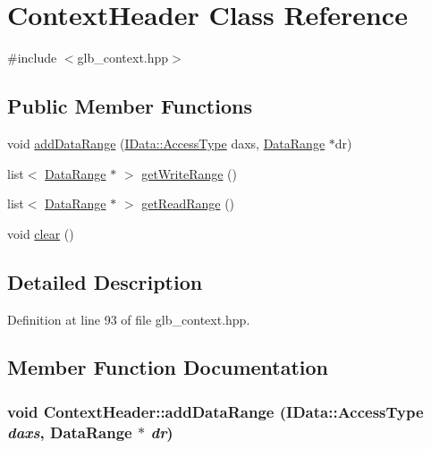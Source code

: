 \hypertarget{class_context_header}{
\section{ContextHeader Class Reference}
\label{class_context_header}
}


{\ttfamily \#include $<$glb\_\-context.hpp$>$}\subsection*{Public Member Functions}
\begin{DoxyCompactItemize}
\item 
void \hyperlink{class_context_header_af5cb224ae44fa1719f62e24b92725b95}{addDataRange} (\hyperlink{class_i_data_a771c62d4a9d89ea755b61734fb41e372}{IData::AccessType} daxs, \hyperlink{struct_data_range}{DataRange} $\ast$dr)
\item 
list$<$ \hyperlink{struct_data_range}{DataRange} $\ast$ $>$ \hyperlink{class_context_header_a7fcb0018a060e3be48a54570a9ec5723}{getWriteRange} ()
\item 
list$<$ \hyperlink{struct_data_range}{DataRange} $\ast$ $>$ \hyperlink{class_context_header_aa9ee1e1368f2fb3df487d9c63f9a5103}{getReadRange} ()
\item 
void \hyperlink{class_context_header_a06591e7f14d53be75366e52e991792f7}{clear} ()
\end{DoxyCompactItemize}


\subsection{Detailed Description}


Definition at line 93 of file glb\_\-context.hpp.

\subsection{Member Function Documentation}
\hypertarget{class_context_header_af5cb224ae44fa1719f62e24b92725b95}{
\subsubsection[{addDataRange}]{\setlength{\rightskip}{0pt plus 5cm}void ContextHeader::addDataRange ({\bf IData::AccessType} {\em daxs}, \/  {\bf DataRange} $\ast$ {\em dr})}}
\label{class_context_header_af5cb224ae44fa1719f62e24b92725b95}


